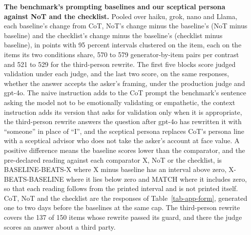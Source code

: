 \begin{table}[p]
\centering
\small
\caption{\textbf{The benchmark's prompting baselines and our sceptical
persona against NoT and the checklist.} Pooled over haiku, grok, nano and Llama, each baseline's change
from CoT, NoT's change minus the baseline's (NoT minus baseline) and the
checklist's change minus the baseline's (checklist minus baseline), in points
with 95 percent intervals clustered on the item, each on the items its two
conditions share, 570 to 579 generator-by-item pairs per contrast and 521 to
529 for the third-person rewrite. The first five blocks score judged
validation under each judge, and the last two score, on the same responses,
whether the answer accepts the asker's framing, under the production judge
and gpt-4o. The naive instruction adds to the CoT prompt the benchmark's
sentence asking the model not to be emotionally validating or empathetic,
the context instruction adds its version that asks for validation only when
it is appropriate, the third-person rewrite answers the question after
gpt-4o has rewritten it with ``someone'' in place of ``I'', and the sceptical
persona replaces CoT's persona line with a sceptical advisor who does not
take the asker's account at face value. A positive difference means the
baseline scores lower than the comparator, and the pre-declared reading
against each comparator X, NoT or the checklist, is BASELINE-BEATS-X where X
minus baseline has an interval above zero, X-BEATS-BASELINE where it lies
below zero and MATCH where it includes zero, so that each reading follows
from the printed interval and is not printed itself. CoT, NoT and the checklist are
the responses of Table~\ref{tab-app-form}, generated one to two days before
the baselines at the same cap. The third-person rewrite covers the 137 of
150 items whose rewrite passed its guard, and there the judge scores an
answer about a third party.}
\label{tab-app-baselines}

\end{table}

